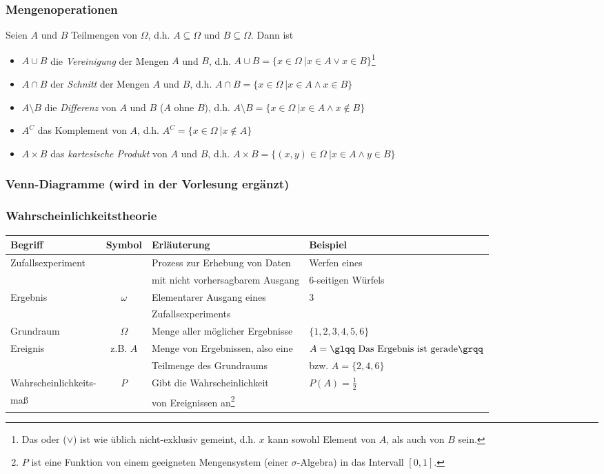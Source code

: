 \begin{frame}
\frametitle{Mengenoperationen}
Seien $A$ und $B$ Teilmengen von $\Omega$, d.h. $A \subseteq \Omega$ und $B \subseteq \Omega$. Dann ist
\begin{itemize}
\item $A\cup B$ die \textit{Vereinigung} der Mengen $A$ und $B$, d.h. $A\cup B = \lbrace x \in \Omega~  | x\in A \vee x\in B\rbrace$\footnote{Das \glqq oder \grqq{} ($\vee$) ist wie üblich nicht-exklusiv gemeint, d.h. $x$ kann sowohl Element von $A$, als auch von $B$ sein.}
\pause
\item $A \cap B$ der \textit{Schnitt} der Mengen $A$ und $B$, d.h. $A\cap B = \lbrace x \in \Omega~ | x\in A \wedge x\in B\rbrace$
\pause
\item $A \setminus B$ die \textit{Differenz} von $A$ und $B$ (\glqq $A$ ohne $B$\grqq), d.h. $A\setminus B = \lbrace x \in \Omega~ | x\in A \wedge x\notin B\rbrace$
\pause
\item $A^C$ das Komplement von $A$, d.h. $A^C = \lbrace x \in \Omega~ | x \notin A \rbrace$
\pause
\item $A \times B$ das \textit{kartesische Produkt} von $A$ und $B$, d.h. $A\times B = \lbrace (x,y)\in\Omega ~ | x\in A \wedge y\in B \rbrace$
\end{itemize}
\end{frame}
\begin{frame}
\frametitle{Venn-Diagramme (wird in der Vorlesung ergänzt)}
\end{frame}
\begin{frame}
\frametitle{Wahrscheinlichkeitstheorie}
\begin{tabular}{l|c|l|l}
Begriff & Symbol & Erläuterung & Beispiel\\
\hline
\pause
Zufallsexperiment & & Prozess zur Erhebung von Daten  &Werfen eines \\
				& &mit nicht vorhersagbarem Ausgang	&			6-seitigen Würfels\\[3pt]
\pause
Ergebnis &$\omega$& Elementarer Ausgang eines  & 3\\
	&  & Zufallsexperiments & \\[3pt]
\pause
Grundraum &$\Omega$& Menge aller möglicher Ergebnisse & $\{1,2,3,4,5,6\}$\\[3pt]
\pause
Ereignis&z.B. $A$& Menge von Ergebnissen, also eine  & $A = \text{\glqq Das Ergebnis ist gerade\grqq}$ \\	
		& & Teilmenge des Grundraums & bzw. $A=\{2,4,6\}$\\[3pt]
\pause
Wahrscheinlichkeits- & $P$ & Gibt die Wahrscheinlichkeit  & $P(A) = \frac{1}{2}$\\
maß & & von Ereignissen an\footnote{$P$ ist eine Funktion von einem geeigneten Mengensystem (einer $\sigma$-Algebra) in das Intervall $[0,1]$.} & \\
\end{tabular}
\end{frame}
